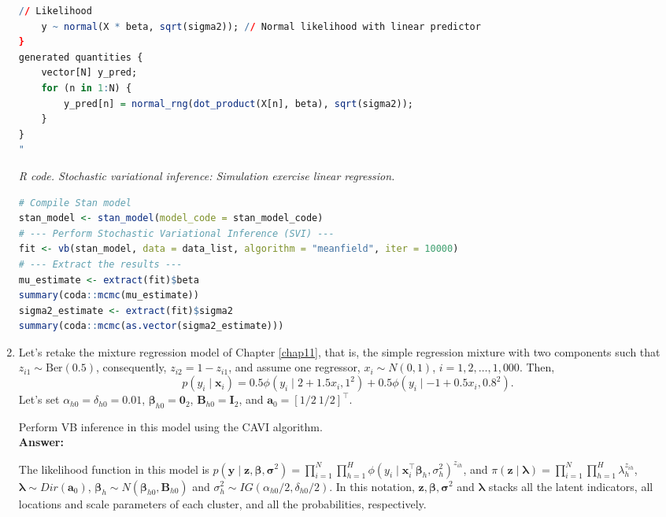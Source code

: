 \begin{enumerate}[leftmargin=*]
\begin{tcolorbox}[enhanced,width=4.67in,center upper,
	fontupper=\large\bfseries,drop shadow southwest,sharp corners]
\begin{VF}
\begin{lstlisting}[language=R]
	// Likelihood
	y ~ normal(X * beta, sqrt(sigma2)); // Normal likelihood with linear predictor
}
generated quantities {
	vector[N] y_pred;
	for (n in 1:N) {
		y_pred[n] = normal_rng(dot_product(X[n], beta), sqrt(sigma2));
	}
}
"
\end{lstlisting}
	\end{VF}
\end{tcolorbox}

\begin{tcolorbox}[enhanced,width=4.67in,center upper,
	fontupper=\large\bfseries,drop shadow southwest,sharp corners]
	\textit{R code. Stochastic variational inference: Simulation exercise linear regression.}
	\begin{VF}
		\begin{lstlisting}[language=R]
# Compile Stan model
stan_model <- stan_model(model_code = stan_model_code)
# --- Perform Stochastic Variational Inference (SVI) ---
fit <- vb(stan_model, data = data_list, algorithm = "meanfield", iter = 10000)
# --- Extract the results ---
mu_estimate <- extract(fit)$beta
summary(coda::mcmc(mu_estimate))
sigma2_estimate <- extract(fit)$sigma2
summary(coda::mcmc(as.vector(sigma2_estimate)))
		\end{lstlisting}
	\end{VF}
\end{tcolorbox}

\item Let's retake the mixture regression model of Chapter \ref{chap11}, that is, the simple regression mixture with two components such that $z_{i1}\sim \text{Ber}(0.5)$, consequently, $z_{i2}=1-z_{i1}$, and assume one regressor, $x_i\sim N(0,1)$, $i=1,2,\dots,1,000$. Then, 
$$p(y_i \mid \boldsymbol{x}_i) = 
0.5 \phi(y_i \mid 2+1.5x_i,1^2)+0.5 \phi(y_i \mid -1+0.5x_i,0.8^2).$$
Let's set $\alpha_{h0}=\delta_{h0}=0.01$, $\boldsymbol{\beta}_{h0}=\boldsymbol{0}_2$, $\boldsymbol{B}_{h0}=\boldsymbol{I}_2$, and $\boldsymbol{a}_0=[1/2 \ 1/2]^{\top}$.

Perform VB inference in this model using the CAVI algorithm.\\

\textbf{Answer:}

The likelihood function in this model is $p(\bm{y}\mid \bm{z},\bm{\beta},\bm{\sigma}^2)=\prod_{i=1}^N\prod_{h=1}^H\phi(y_i\mid\bm{x}_i^{\top}\bm{\beta}_h,\sigma_h^2)^{z_{ih}}$, and $\pi(\bm{z}\mid\bm{\lambda})=\prod_{i=1}^N\prod_{h=1}^H\lambda_h^{z_{ih}}$, $\bm{\lambda}\sim Dir(\bm{a}_0)$, $\bm{\beta}_h\sim N(\bm{\beta}_{h0},\bm{B}_{h0})$ and $\sigma_h^2\sim IG(\alpha_{h0}/2,\delta_{h0}/2)$. In this notation, $\bm{z},\bm{\beta},\bm{\sigma}^2$ and $\bm{\lambda}$ stacks all the latent indicators, all locations and scale parameters of each cluster, and all the probabilities, respectively. 


\end{enumerate}

